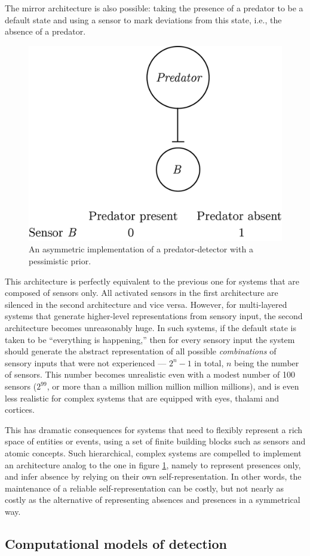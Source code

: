 \documentclass[12pt,twoside]{reedthesis}
\begin{document}
The mirror architecture is also possible: taking the presence of a predator to be a default state and using a sensor to mark deviations from this state, i.e., the absence of a predator.
\begin{figure}
\includegraphics[width=0.5\linewidth]{figure/intro/pessimistic} \caption{An asymmetric implementation of a predator-detector with a pessimistic prior.}\label{fig:intro-pessimistic}
\end{figure}
This architecture is perfectly equivalent to the previous one for systems that are composed of sensors only. All activated sensors in the first architecture are silenced in the second architecture and vice versa. However, for multi-layered systems that generate higher-level representations from sensory input, the second architecture becomes unreasonably huge. In such systems, if the default state is taken to be ``everything is happening,'' then for every sensory input the system should generate the abstract representation of all possible \emph{combinations} of sensory inputs that were not experienced --- \(2^n-1\) in total, \(n\) being the number of sensors. This number becomes unrealistic even with a modest number of 100 sensors (\(2^{99}\), or more than a million million million million millions), and is even less realistic for complex systems that are equipped with eyes, thalami and cortices.

This has dramatic consequences for systems that need to flexibly represent a rich space of entities or events, using a set of finite building blocks such as sensors and atomic concepts. Such hierarchical, complex systems are compelled to implement an architecture analog to the one in figure \ref{fig:intro-pessimistic}, namely to represent presences only, and infer absence by relying on their own self-representation. In other words, the maintenance of a reliable self-representation can be costly, but not nearly as costly as the alternative of representing absences and presences in a symmetrical way.

\hypertarget{detectionmodels}{%
\subsection{Computational models of detection}\label{detectionmodels}}
\end{document}
